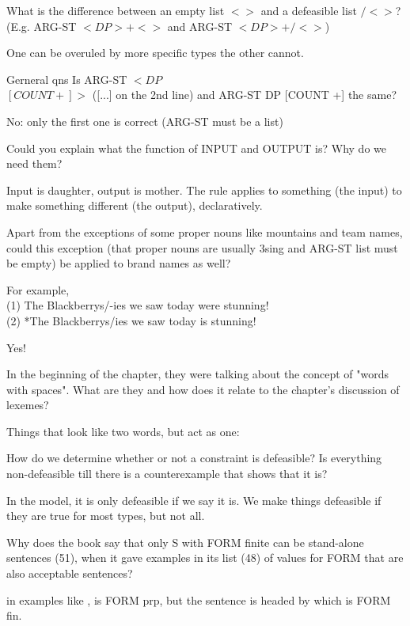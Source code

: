 \documentclass[a4paper,landscape,headrule,footrule,dvips]{foils}
\begin{document}
\Q
What is the difference between an empty list $ < >$ and a defeasible
list $/< >$? (E.g. ARG-ST $<DP> + < >$ and ARG-ST $<DP> + /< >$)

\A One can be overuled by more specific types the other cannot.

\newpage

\Q Gerneral qns
Is ARG-ST $<DP$ \\
  $[COUNT +]>$ ([...] on the 2nd line)
and ARG-ST DP [COUNT +] the same?

\A No: only the first one is correct (ARG-ST must be a list)

\Q Could you explain what the function of INPUT and OUTPUT is? Why do we need them?

\A Input is daughter, output is mother.   The rule applies to
something (the input) to make something different (the output), declaratively.

\newpage

\Q Apart from the exceptions of some proper nouns like mountains and team names, could this exception (that proper nouns are usually 3sing and ARG-ST list must be empty) be applied to brand names as well?

For example,
\\(1) The Blackberrys/-ies we saw today were stunning!
\\(2) *The Blackberrys/ies we saw today is stunning! 

\A Yes!



\Q In the beginning of the chapter, they were talking about the concept of "words with spaces". What are they and how does it relate to the chapter's discussion of lexemes?

\A Things that look like two words, but act as one: 

\newpage

\Q How do we determine whether or not a constraint is defeasible? Is everything non-defeasible till there is a counterexample that shows that it is? 

\A In the model, it is only defeasible if we say it is.  We make
things defeasible if they are true for most types, but not all.

\Q Why does the book say that only S with FORM finite can be stand-alone sentences (51), when it gave examples in its list (48) of values for FORM that are also acceptable sentences?

\A in examples like ,  is
FORM prp, but the sentence is headed by  which is FORM fin.
\end{document}
